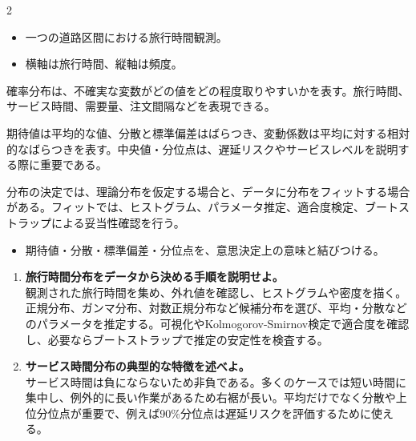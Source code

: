 \clearpage
{}
\begin{multicols}{2}\footnotesize\raggedcolumns
{}
\begin{itemize}
\item 一つの道路区間における旅行時間観測。
\item 横軸は旅行時間、縦軸は頻度。
\end{itemize}
確率分布は、不確実な変数がどの値をどの程度取りやすいかを表す。旅行時間、サービス時間、需要量、注文間隔などを表現できる。\par

期待値は平均的な値、分散と標準偏差はばらつき、変動係数は平均に対する相対的なばらつきを表す。中央値・分位点は、遅延リスクやサービスレベルを説明する際に重要である。\par

分布の決定では、理論分布を仮定する場合と、データに分布をフィットする場合がある。フィットでは、ヒストグラム、パラメータ推定、適合度検定、ブートストラップによる妥当性確認を行う。\par
{}
\begin{itemize}
\item 期待値・分散・標準偏差・分位点を、意思決定上の意味と結びつける。
\end{itemize}
\begin{enumerate}
\item \textbf{旅行時間分布をデータから決める手順を説明せよ。}\\観測された旅行時間を集め、外れ値を確認し、ヒストグラムや密度を描く。正規分布、ガンマ分布、対数正規分布など候補分布を選び、平均・分散などのパラメータを推定する。可視化やKolmogorov-Smirnov検定で適合度を確認し、必要ならブートストラップで推定の安定性を検査する。
\item \textbf{サービス時間分布の典型的な特徴を述べよ。}\\サービス時間は負にならないため非負である。多くのケースでは短い時間に集中し、例外的に長い作業があるため右裾が長い。平均だけでなく分散や上位分位点が重要で、例えば90\%分位点は遅延リスクを評価するために使える。
\end{enumerate}
\end{multicols}


